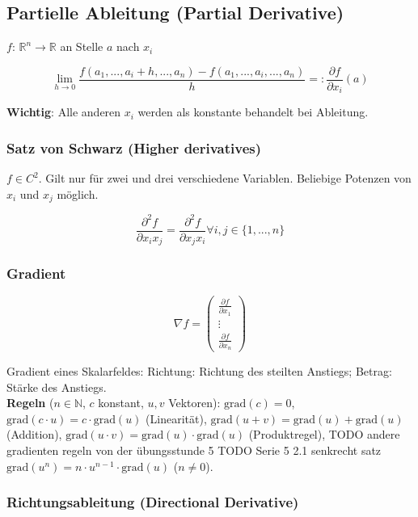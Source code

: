 
\subsection{Partielle Ableitung (Partial Derivative)}

$f$: $\mathbb{R}^n \rightarrow \mathbb{R}$ an Stelle $a$ nach $x_i$

\[
    \lim_{h \rightarrow 0} \frac{f(a_1, ..., a_i + h, ..., a_n) - f(a_1, ..., a_i, ..., a_n)}{h} =: \frac{\partial f}{\partial x_i}(a)
\]

\textbf{Wichtig}: Alle anderen $x_i$ werden als konstante behandelt bei Ableitung.

\subsubsection{Satz von Schwarz (Higher derivatives)}

$f \in C^2$. Gilt nur für zwei und drei verschiedene Variablen. Beliebige Potenzen von $x_i$ und $x_j$ möglich.

\[
    \frac{\partial^2 f}{\partial x_i x_j} = \frac{\partial^2 f}{\partial x_j x_i} \forall i, j \in \{1, ..., n\}
\]


\subsubsection{Gradient}

\[
    \nabla f =
        \begin{pmatrix}
            \frac{\partial f}{\partial x_1}\\
            \vdots\\
            \frac{\partial f}{\partial x_n}
        \end{pmatrix}
\]

Gradient eines Skalarfeldes: Richtung: Richtung des steilten Anstiegs; Betrag: Stärke des Anstiegs.\\

\textbf{Regeln} ($n \in \mathbb{N}$, $c$ konstant, $u, v$ Vektoren):
$\text{grad}(c) = 0$,
$\text{grad}(c \cdot u) = c \cdot \text{grad}(u)$ (Linearität),
$\text{grad}(u + v) = \text{grad}(u) + \text{grad}(u)$ (Addition),
$\text{grad}(u \cdot v) = \text{grad}(u) \cdot \text{grad}(u)$
(Produktregel),
TODO andere gradienten regeln von der übungsstunde 5
TODO Serie 5 2.1 senkrecht satz 
$\text{grad}(u^n) = n \cdot u^{n-1} \cdot \text{grad}(u)$ ($n\neq 0$).

\subsubsection{Richtungsableitung (Directional Derivative)}


